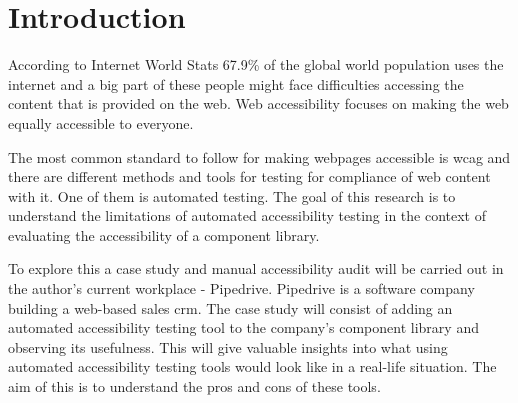 \documentclass{master_thesis}
\begin{document}
\section{Introduction} \label{chap:intro}




According to Internet World Stats 67.9\% of the global world population uses the internet \citep{MMG2023} and a big part of these people might face difficulties accessing the content that is provided on the web. Web accessibility focuses on making the web equally accessible to everyone.


The most common standard to follow for making webpages accessible is \ac{wcag} and there are different methods and tools for testing for compliance of web content with it. One of them is automated testing. The goal of this research is to understand the limitations of automated accessibility testing in the context of evaluating the accessibility of a component library.


To explore this a case study and manual accessibility audit will be carried out in the author's current workplace - Pipedrive. Pipedrive is a software company building a web-based sales \ac{crm}. The case study will consist of adding an automated accessibility testing tool to the company's component library and observing its usefulness. This will give valuable insights into what using automated accessibility testing tools would look like in a real-life situation. The aim of this is to understand the pros and cons of these tools.
\end{document}

